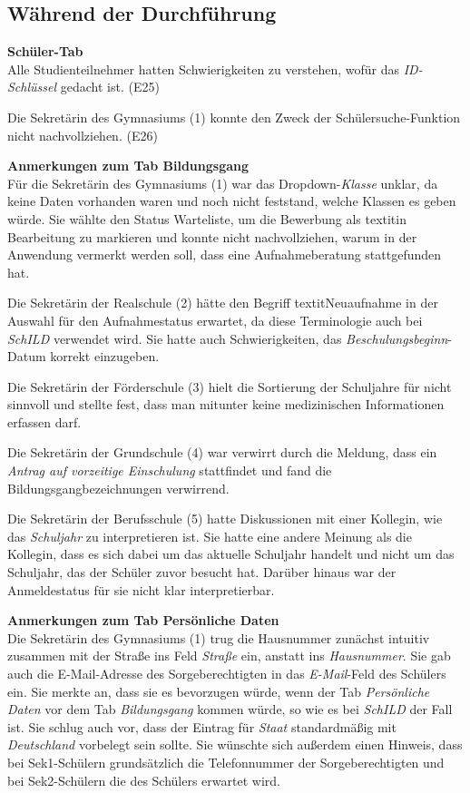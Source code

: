 \subsection{Während der Durchführung}

\textbf{\glqq Schüler\grqq{}-Tab}\\  
Alle Studienteilnehmer hatten Schwierigkeiten zu verstehen, wofür das \textit{ID-Schlüssel} gedacht ist. (E25)

Die Sekretärin des Gymnasiums (1) konnte den Zweck der Schülersuche-Funktion nicht nachvollziehen. (E26)


\textbf{Anmerkungen zum Tab \glqq Bildungsgang\grqq{}}\\
Für die Sekretärin des Gymnasiums (1) war das Dropdown-\textit{Klasse} unklar, da keine Daten vorhanden waren und noch nicht feststand, welche Klassen es geben würde. Sie wählte den Status \glqq Warteliste\grqq{}, um die Bewerbung als textit{in Bearbeitung} zu markieren und konnte nicht nachvollziehen, warum in der Anwendung vermerkt werden soll, dass eine Aufnahmeberatung stattgefunden hat.

Die Sekretärin der Realschule (2) hätte den Begriff textit{Neuaufnahme} in der Auswahl für den Aufnahmestatus erwartet, da diese Terminologie auch bei \textit{SchILD} verwendet wird. Sie hatte auch Schwierigkeiten, das \textit{Beschulungsbeginn}-Datum korrekt einzugeben.

Die Sekretärin der Förderschule (3) hielt die Sortierung der Schuljahre für nicht sinnvoll und stellte fest, dass man mitunter keine medizinischen Informationen erfassen darf.

Die Sekretärin der Grundschule (4) war verwirrt durch die Meldung, dass ein \textit{Antrag auf vorzeitige Einschulung} stattfindet und fand die Bildungsgangbezeichnungen verwirrend.

Die Sekretärin der Berufsschule (5) hatte Diskussionen mit einer Kollegin, wie das \textit{Schuljahr} zu interpretieren ist. Sie hatte eine andere Meinung als die Kollegin, dass es sich dabei um das aktuelle Schuljahr handelt und nicht um das Schuljahr, das der Schüler zuvor besucht hat. Darüber hinaus war der Anmeldestatus für sie nicht klar interpretierbar.

\textbf{Anmerkungen zum Tab \glqq Persönliche Daten\grqq{}}\\
Die Sekretärin des Gymnasiums (1) trug die Hausnummer zunächst intuitiv zusammen mit der Straße ins Feld \textit{Straße} ein, anstatt ins \textit{Hausnummer}. Sie gab auch die E-Mail-Adresse des Sorgeberechtigten in das \textit{E-Mail}-Feld des Schülers ein. Sie merkte an, dass sie es bevorzugen würde, wenn der Tab \textit{Persönliche Daten} vor dem Tab \textit{Bildungsgang} kommen würde, so wie es bei \textit{SchILD}  der Fall ist. Sie schlug auch vor, dass der Eintrag für \textit{Staat} standardmäßig mit \textit{Deutschland} vorbelegt sein sollte. Sie wünschte sich außerdem einen Hinweis, dass bei Sek1-Schülern grundsätzlich die Telefonnummer der Sorgeberechtigten und bei Sek2-Schülern die des Schülers erwartet wird.

